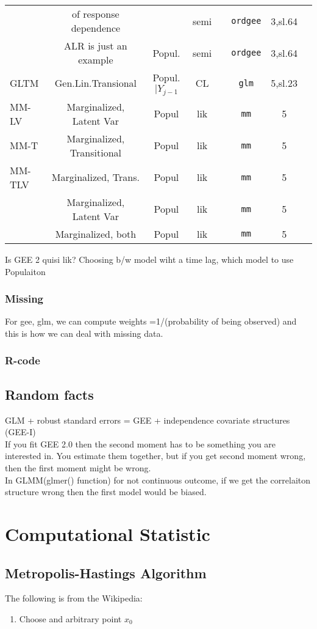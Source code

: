 \documentclass[]{article}
\begin{document}
\begin{tabular}{|l|| c| c | c |c|c|c|c}
	   & of response dependence  &  &semi &   &  \texttt{ordgee}  &  3,sl.64   &     \\
	    & ALR is just an example  &  Popul.  &semi &   &  \texttt{ordgee}  &  3,sl.64   &     \\
	  \hline
	  GLTM & Gen.Lin.Transional  & Popul.$|Y_{j-1}$ & CL  &   &   \texttt{glm} &  5,sl.23   &    \\
	  \hline
	  MM-LV & Marginalized, Latent Var  & Popul &lik  &   &   \texttt{mm} &  5  &    \\
	  \hline
	  MM-T &  Marginalized, Transitional  & Popul &lik  &   &  \texttt{mm} &  5   &     \\
	  \hline
	  MM-TLV &  Marginalized, Trans.    & Popul &lik  &   &  \texttt{mm}  &  5  &     \\
	    &  Marginalized,   Latent Var   & Popul &lik  &   &  \texttt{mm}  &  5  &     \\
	    &  Marginalized, both   & Popul &lik  &   &  \texttt{mm}  &  5  &     \\
	  \hline
	  \hline
	  \hline
	\end{tabular}

Is GEE 2 quisi lik?
Choosing b/w model wiht a time lag, which model to use \\
Populaiton

	\subsubsection{Missing}
	For gee, glm, we can compute weights =1/(probability of being observed) and this is how we can deal with missing data.
	\subsubsection{R-code}

\subsection{Random facts}
GLM + robust standard errors = GEE + independence covariate structures (GEE-I)\\
If you fit GEE 2.0 then the second moment has to be something you are interested in. You estimate them together, but if you get second moment wrong, then the first moment might be wrong.\\
In GLMM(glmer() function) for not continuous outcome, if we get the correlaiton structure wrong then the first model would be biased.

\section{Computational Statistic}
\subsection{Metropolis-Hastings Algorithm}
The following is from the Wikipedia:\\
\begin{enumerate}[1)]
	\item Choose and arbitrary point $x_0$
\end{enumerate}
	
\end{document}
